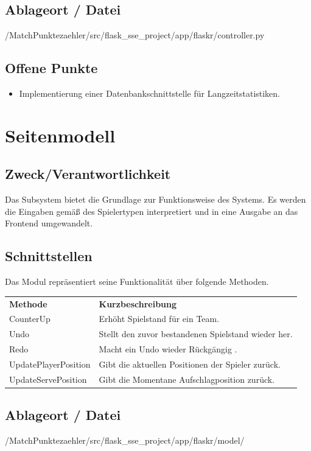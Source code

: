 \subsection*{Ablageort / Datei}
/MatchPunktezaehler/src/flask\_sse\_project/app/flaskr/controller.py
\subsection*{Offene Punkte}
\begin{itemize}
	\item Implementierung einer Datenbankschnittstelle für Langzeitstatistiken.
\end{itemize}

\section{Seitenmodell}
\subsection*{Zweck/Verantwortlichkeit}
Das Subsystem bietet die Grundlage zur Funktionsweise des Systems. Es werden die Eingaben gemäß des Spielertypen interpretiert und in eine Ausgabe an das Frontend umgewandelt.
\subsection*{Schnittstellen}
Das Modul repräsentiert seine Funktionalität über folgende Methoden.
\begin{center}
\begin{tabular}[h]{|l|l|}
\cline{1-2}
\textbf{Methode} & \textbf{Kurzbeschreibung}\\
\cline{1-2}
CounterUp & Erhöht Spielstand für ein Team.\\ 
\cline{1-2}
Undo & Stellt den zuvor bestandenen Spielstand wieder her.\\
\cline{1-2}
Redo & Macht ein Undo wieder Rückgängig .\\
\cline{1-2}
UpdatePlayerPosition & Gibt die aktuellen Positionen der Spieler zurück.\\
\cline{1-2} 
UpdateServePosition & Gibt die Momentane Aufschlagposition zurück.\\
\cline{1-2}
\end{tabular}
\end{center}
\subsection*{Ablageort / Datei}
/MatchPunktezaehler/src/flask\_sse\_project/app/flaskr/model/
